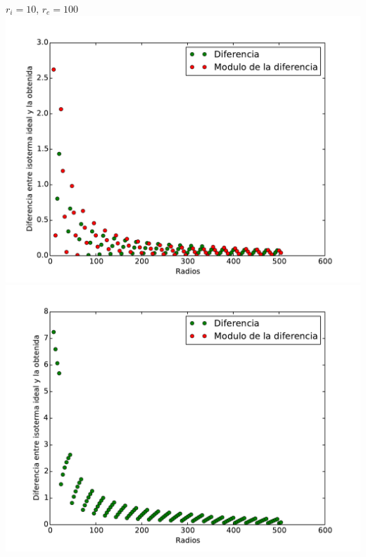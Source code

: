 $r_i = 10$, $r_e = 100$ \\
\includegraphics[scale=0.45]{graficos/mVariable_l_10_100.pdf}
\includegraphics[scale=0.45]{graficos/mVariable_w_10_100.pdf}
\newline

